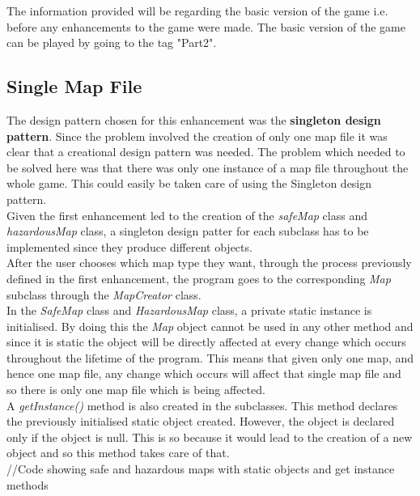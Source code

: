 \documentclass[a4paper,12pt]{extarticle}
\begin{document}
The information provided will be regarding the basic version of the game i.e. before any enhancements to the game were made. The basic version of the game can be played by going to the tag "Part2".

\subsection{Single Map File}

The design pattern chosen for this enhancement was the \textbf{singleton design pattern}. Since the problem involved the creation of only one map file it was clear that a creational design pattern was needed. The problem which needed to be solved here was that there was only one instance of a map file throughout the whole game. This could easily be taken care of using the Singleton design pattern.\\

\noindent Given the first enhancement led to the creation of the \textit{safeMap} class and \textit{hazardousMap} class, a singleton design patter for each subclass has to be implemented since they produce different objects.\\

After the user chooses which map type they want, through the process previously defined in the first enhancement, the program goes to the corresponding \textit{Map} subclass through the \textit{MapCreator} class.\\ 

In the \textit{SafeMap} class and \textit{HazardousMap} class, a private static instance is initialised. By doing this the \textit{Map} object cannot be used in any other method and since it is static the object will be directly affected at every change which occurs throughout the lifetime of the program. This means that given only one map, and hence one map file, any change which occurs will affect that single map file and so there is only one map file which is being affected.\\

A \textit{getInstance()} method is also created in the subclasses. This method declares the previously initialised static object created. However, the object is declared only if the object is null. This is so because it would lead to the creation of a new object and so this method takes care of that.\\

//Code showing safe and hazardous maps with static objects and get instance methods\\
\end{document}
